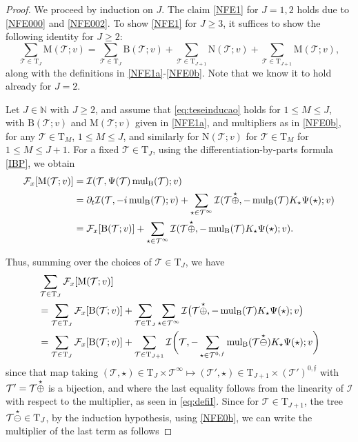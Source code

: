 \documentclass[%
11pt,  reqno]{amsart}
\makeatletter
\newcommand{\5}{\textup{V}}
\newcommand{\noi}{\noindent}
\newcommand{\dt}{\partial_t}
\theoremstyle{remark}
\newcommand{\TT}{\mathcal{T}}
\newcommand{\Tr}{\mathrm{T}}
\newcommand{\Ft}{{\mathcal{F}}}
\newcommand{\ff}{\mathfrak{f}}
\newcommand{\N}{\mathbb{N}}
\DeclareMathOperator{\mulB}{mul_{\BB}}
\def\<#1>{\csname MH@symb@#1\endcsname}
\newcommand{\Ical}{\mathcal{I}}
\numberwithin{equation}{section}
\numberwithin{theorem}{section}
\newcommand{\MM}{\mathrm{M}}
\newcommand{\NN}{\mathrm{N}}
\newcommand{\BB}{\mathrm{B}}
\makeatother
\begin{document}
\begin{proof}



We proceed by induction on $J$. 
The claim \eqref{NFE1} for $J=1,2$ holds due to \eqref{NFE000} and \eqref{NFE002}.
To show \eqref{NFE1} for $J\ge3$, it suffices to show the following identity for $J\ge 2$:
\begin{equation}\label{eq:teseinducao}
\sum_{\TT\in\Tr_{J}} \MM(\TT; v) 
= 
\sum_{\TT\in \Tr_{J}} \BB(\TT; v) 
+
\sum_{\TT\in \Tr_{J+1}} \NN(\TT; v) 
+ \sum_{\TT\in \Tr_{J+1}} \MM(\TT; v),
\end{equation}
along with the definitions in \eqref{NFE1a}-\eqref{NFE0b}. Note that we know it to hold already for $J=2$. 


Let $J\in \N$ with $J\ge2$, and assume that \eqref{eq:teseinducao} holds for $1\le M \le J$, 
with $\BB(\TT; v)$ and $\MM(\TT; v)$ given in \eqref{NFE1a}, and multipliers as in \eqref{NFE0b}, for any $\TT\in \Tr_M$, $1\le M \le J$, and similarly for $\NN(\TT; v)$ for $\TT\in \Tr_M$ for $1\le M \le J+1$.
For a fixed $\TT\in\Tr_{J}$, using the differentiation-by-parts formula \eqref{IBP}, we obtain
\begin{align*}
\Ft_x [\MM(\TT; v) ]
&
=\Ical(\TT, \Psi(\TT)\mulB(\TT); v)
\\
& =
\dt\Ical(\TT, -i \mulB(\TT); v) +
\sum_{\star\in\TT^\infty}
\Ical (\TT \overset{\star}{\oplus} \<1>, -\mulB(\TT) K_\star \Psi(\star) ; v )
\\
&
= \Ft_x[\BB(\TT; v) ]  
+
\sum_{\star\in\TT^\infty} \Ical (\TT \overset{\star}{\oplus} \<1>, -\mulB(\TT) K_\star \Psi(\star) ; v).
\end{align*}



\noi
Thus, summing over the choices of $\TT \in \Tr_{J}$, we have
\begin{align}
\label{mul2a}
\begin{split}
&
\sum_{\TT\in \Tr_{J}} \Ft_x [\MM(\TT; v) ]
\\
&
= \sum_{\TT\in \Tr_{J}} \Ft_x[\BB(\TT; v) ]
+
\sum_{\TT\in \Tr_{J}}
\sum_{\star\in\TT^\infty}
\Ical 
\big(\TT \overset{\star}{\oplus} \<1>,
-\mulB(\TT) K_\star \Psi(\star);  v \big) 
\\
&
=
 \sum_{\TT\in \Tr_{J}} \Ft_x[\BB(\TT; v) ]
+
\sum_{\TT\in \Tr_{J+1}}
\Ical 
\bigg(\TT,
-\sum_{\star\in\TT^{0,f}}
\mulB(\TT \overset{\star}{\ominus}  \<1> ) K_\star \Psi(\star) ;
v
\bigg) 
\end{split}
\end{align}
since that map taking $(\TT, \star) \in \Tr_J \times \TT^\infty \mapsto (\TT', \star) \in \Tr_{J+1} \times (\TT')^{0,\ff}$ with $\TT' = \TT \overset{\star}{\oplus} \<1>$ is a bijection, and  
where the last equality follows from the linearity of $\Ical$ with respect to the multiplier, as seen in \eqref{eq:defiI}. Since for $\TT\in \Tr_{J+1}$, the tree $\TT \overset{\star}{\ominus} \<1>\in \Tr_{J}$, by the induction hypothesis, using \eqref{NFE0b}, we can write the multiplier of the last term as follows


\end{proof}
\end{document}
